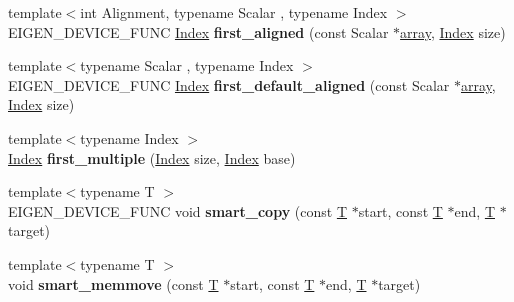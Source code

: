 \begin{DoxyCompactItemize}
\mbox{\label{namespace_eigen_1_1internal_adbf078c78da41b6c2ca7f85cf32e59b5}} 
{\footnotesize template$<$int Alignment, typename Scalar , typename Index $>$ }\\E\+I\+G\+E\+N\+\_\+\+D\+E\+V\+I\+C\+E\+\_\+\+F\+U\+NC \hyperlink{namespace_eigen_a62e77e0933482dafde8fe197d9a2cfde}{Index} {\bfseries first\+\_\+aligned} (const Scalar $\ast$\hyperlink{class_eigen_1_1array}{array}, \hyperlink{namespace_eigen_a62e77e0933482dafde8fe197d9a2cfde}{Index} size)
\item 
\mbox{\label{namespace_eigen_1_1internal_aef45b3d13f972b0edee7537f50c929c9}} 
{\footnotesize template$<$typename Scalar , typename Index $>$ }\\E\+I\+G\+E\+N\+\_\+\+D\+E\+V\+I\+C\+E\+\_\+\+F\+U\+NC \hyperlink{namespace_eigen_a62e77e0933482dafde8fe197d9a2cfde}{Index} {\bfseries first\+\_\+default\+\_\+aligned} (const Scalar $\ast$\hyperlink{class_eigen_1_1array}{array}, \hyperlink{namespace_eigen_a62e77e0933482dafde8fe197d9a2cfde}{Index} size)
\item 
\mbox{\label{namespace_eigen_1_1internal_a5692cd3c30a1b398f9c6d23edca0262f}} 
{\footnotesize template$<$typename Index $>$ }\\\hyperlink{namespace_eigen_a62e77e0933482dafde8fe197d9a2cfde}{Index} {\bfseries first\+\_\+multiple} (\hyperlink{namespace_eigen_a62e77e0933482dafde8fe197d9a2cfde}{Index} size, \hyperlink{namespace_eigen_a62e77e0933482dafde8fe197d9a2cfde}{Index} base)
\item 
\mbox{\label{namespace_eigen_1_1internal_aaa5263274e83e4b19ff5558046f1077f}} 
{\footnotesize template$<$typename T $>$ }\\E\+I\+G\+E\+N\+\_\+\+D\+E\+V\+I\+C\+E\+\_\+\+F\+U\+NC void {\bfseries smart\+\_\+copy} (const \hyperlink{group___sparse_core___module}{T} $\ast$start, const \hyperlink{group___sparse_core___module}{T} $\ast$end, \hyperlink{group___sparse_core___module}{T} $\ast$target)
\item 
\mbox{\label{namespace_eigen_1_1internal_ab62b385a18b8a749eded9322d0b853ac}} 
{\footnotesize template$<$typename T $>$ }\\void {\bfseries smart\+\_\+memmove} (const \hyperlink{group___sparse_core___module}{T} $\ast$start, const \hyperlink{group___sparse_core___module}{T} $\ast$end, \hyperlink{group___sparse_core___module}{T} $\ast$target)

\end{DoxyCompactItemize}
